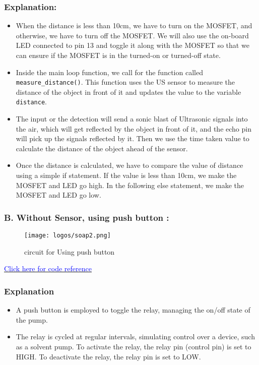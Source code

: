 \documentclass[table]{rapportCS}
\begin{document}
\subsubsection*{Explanation:}
\begin{itemize}[label=$\bullet$]
    
\item When the distance is less than 10cm, we have to turn on the MOSFET, and otherwise, we have to turn off the MOSFET. We will also use the on-board LED connected to pin 13 and toggle it along with the MOSFET so that we can ensure if the MOSFET is in the turned-on or turned-off state.

\item Inside the main loop function, we call for the function called \texttt{measure\_distance()}. This function uses the US sensor to measure the distance of the object in front of it and updates the value to the variable \texttt{distance}.

\item The input or the detection will send a sonic blast of Ultrasonic signals into the air, which will get reflected by the object in front of it, and the echo pin will pick up the signals reflected by it. Then we use the time taken value to calculate the distance of the object ahead of the sensor.

\item Once the distance is calculated, we have to compare the value of distance using a simple if statement. If the value is less than 10cm, we make the MOSFET and LED go high. In the following else statement, we make the MOSFET and LED go low.
\end{itemize}
\clearpage
\subsubsection{B. Without Sensor, using push button : }
\begin{figure}[h]
    \centering
    \texttt{[image: logos/soap2.png]}
    \caption{ circuit for Using push button}
    \label{fig:outlinemindmap}
\end{figure}
\href{https://github.com/naunidhsingh03/ELP305-TribeD-Resources/blob/5ba1988fe283faba21ba7098978bb225e509d5cb/Codes/solvent_spinkler_new_design_1.ino}{\textcolor{blue}{Click here for code reference}}
\subsubsection*{Explanation}
\begin{itemize}[label=$\bullet$]
    \item A push button is employed to toggle the relay, managing the on/off state of the pump.
    \item The relay is cycled at regular intervals, simulating control over a device, such as a solvent pump.
     To activate the relay, the relay pin (control pin) is set to HIGH.
     To deactivate the relay, the relay pin is set to LOW.
\end{itemize}
\end{document}
